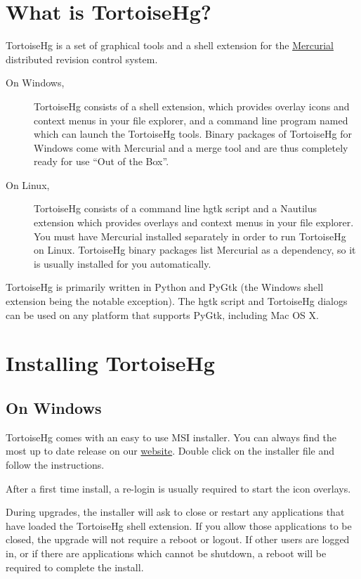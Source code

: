 \documentclass[letterpaper,10pt,english]{manual}
\begin{document}
\section{What is TortoiseHg?}

TortoiseHg is a set of graphical tools and a shell extension for the
\href{http://mercurial.selenic.com/wiki/}{Mercurial} distributed revision control
system.
\begin{description}
\item[On Windows,]
TortoiseHg consists of a shell extension, which provides overlay
icons and context menus in your file explorer, and a command line
program named  which can launch the TortoiseHg tools.
Binary packages of TortoiseHg for Windows come with Mercurial and a
merge tool and are thus completely ready for use ``Out of the Box''.

\item[On Linux,]
TortoiseHg consists of a command line hgtk script and a Nautilus
extension which provides overlays and context menus in your file
explorer.  You must have Mercurial installed separately in order to
run TortoiseHg on Linux.  TortoiseHg binary packages list Mercurial
as a dependency, so it is usually installed for you automatically.

\end{description}

TortoiseHg is primarily written in Python and PyGtk (the Windows shell
extension being the notable exception).  The hgtk script and TortoiseHg
dialogs can be used on any platform that supports PyGtk, including Mac
OS X.


\section{Installing TortoiseHg}


\subsection{On Windows}

TortoiseHg comes with an easy to use MSI installer.  You can always find
the most up to date release on our \href{http://tortoisehg.bitbucket.org/download/windows.html}{website}.
Double click on the installer file and follow the instructions.

After a first time install, a re-login is usually required to start the
icon overlays.

During upgrades, the installer will ask to close or restart any
applications that have loaded the TortoiseHg shell extension.  If you
allow those applications to be closed, the upgrade will not require a
reboot or logout.  If other users are logged in, or if there are
applications which cannot be shutdown, a reboot will be required to
complete the install.
\end{document}
